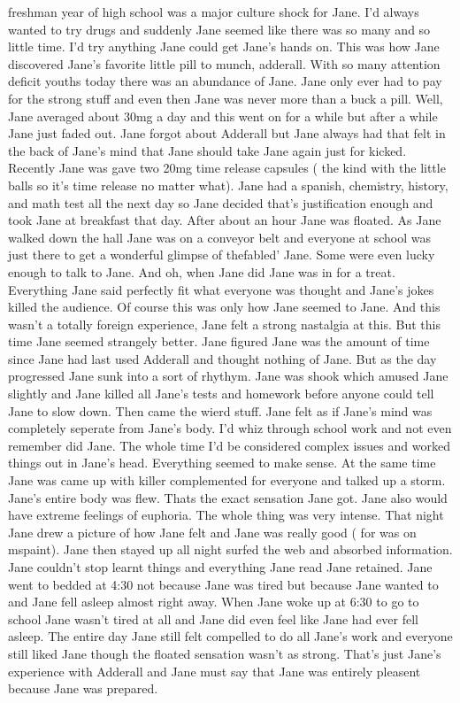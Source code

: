 \documentclass[12pt]{book}
\begin{document}
freshman year of high school was a major culture shock for Jane. I'd always wanted to try drugs and suddenly Jane seemed like there was so many and so little time. I'd try anything Jane could get Jane's hands on. This was how Jane discovered Jane's favorite little pill to munch, adderall. With so many attention deficit youths today there was an abundance of Jane. Jane only ever had to pay for the strong stuff and even then Jane was never more than a buck a pill. Well, Jane averaged about 30mg a day and this went on for a while but after a while Jane just faded out. Jane forgot about Adderall but Jane always had that felt in the back of Jane's mind that Jane should take Jane again just for kicked. Recently Jane was gave two 20mg time release capsules ( the kind with the little balls so it's time release no matter what). Jane had a spanish, chemistry, history, and math test all the next day so Jane decided that's justification enough and took Jane at breakfast that day. After about an hour Jane was floated. As Jane walked down the hall Jane was on a conveyor belt and everyone at school was just there to get a wonderful glimpse of thefabled' Jane. Some were even lucky enough to talk to Jane. And oh, when Jane did Jane was in for a treat. Everything Jane said perfectly fit what everyone was thought and Jane's jokes killed the audience. Of course this was only how Jane seemed to Jane. And this wasn't a totally foreign experience, Jane felt a strong nastalgia at this. But this time Jane seemed strangely better. Jane figured Jane was the amount of time since Jane had last used Adderall and thought nothing of Jane. But as the day progressed Jane sunk into a sort of rhythym. Jane was shook which amused Jane slightly and Jane killed all Jane's tests and homework before anyone could tell Jane to slow down. Then came the wierd stuff. Jane felt as if Jane's mind was completely seperate from Jane's body. I'd whiz through school work and not even remember did Jane. The whole time I'd be considered complex issues and worked things out in Jane's head. Everything seemed to make sense. At the same time Jane was came up with killer complemented for everyone and talked up a storm. Jane's entire body was flew. Thats the exact sensation Jane got. Jane also would have extreme feelings of euphoria. The whole thing was very intense. That night Jane drew a picture of how Jane felt and Jane was really good ( for was on mspaint). Jane then stayed up all night surfed the web and absorbed information. Jane couldn't stop learnt things and everything Jane read Jane retained. Jane went to bedded at 4:30 not because Jane was tired but because Jane wanted to and Jane fell asleep almost right away. When Jane woke up at 6:30 to go to school Jane wasn't tired at all and Jane did even feel like Jane had ever fell asleep. The entire day Jane still felt compelled to do all Jane's work and everyone still liked Jane though the floated sensation wasn't as strong. That's just Jane's experience with Adderall and Jane must say that Jane was entirely pleasent because Jane was prepared.
\end{document}
